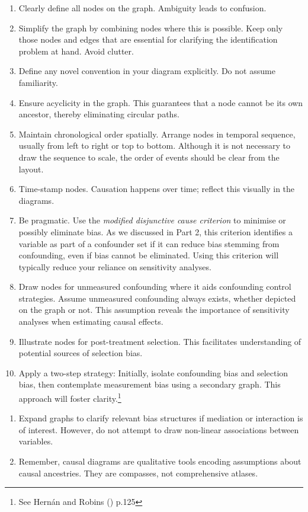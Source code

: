 \documentclass[
  singlecolumn,
  9pt]{article}
\begin{document}
\begin{enumerate}
\def\labelenumi{\arabic{enumi}.}
\item
  Clearly define all nodes on the graph. Ambiguity leads to confusion.
\item
  Simplify the graph by combining nodes where this is possible. Keep
  only those nodes and edges that are essential for clarifying the
  identification problem at hand. Avoid clutter.
\item
  Define any novel convention in your diagram explicitly. Do not assume
  familiarity.
\item
  Ensure acyclicity in the graph. This guarantees that a node cannot be
  its own ancestor, thereby eliminating circular paths.
\item
  Maintain chronological order spatially. Arrange nodes in temporal
  sequence, usually from left to right or top to bottom. Although it is
  not necessary to draw the sequence to scale, the order of events
  should be clear from the layout.
\item
  Time-stamp nodes. Causation happens over time; reflect this visually
  in the diagrams.
\item
  Be pragmatic. Use the \emph{modified disjunctive cause criterion} to
  minimise or possibly eliminate bias. As we discussed in Part 2, this
  criterion identifies a variable as part of a confounder set if it can
  reduce bias stemming from confounding, even if bias cannot be
  eliminated. Using this criterion will typically reduce your reliance
  on sensitivity analyses.
\item
  Draw nodes for unmeasured confounding where it aids confounding
  control strategies. Assume unmeasured confounding always exists,
  whether depicted on the graph or not. This assumption reveals the
  importance of sensitivity analyses when estimating causal effects.
\item
  Illustrate nodes for post-treatment selection. This facilitates
  understanding of potential sources of selection bias.
\item
  Apply a two-step strategy: Initially, isolate confounding bias and
  selection bias, then contemplate measurement bias using a secondary
  graph. This approach will foster clarity.\footnote{See Hernán and
    Robins () p.125}
\end{enumerate}

\begin{enumerate}
\def\labelenumi{\arabic{enumi}.}
\setcounter{enumi}{10}
\item
  Expand graphs to clarify relevant bias structures if mediation or
  interaction is of interest. However, do not attempt to draw non-linear
  associations between variables.
\item
  Remember, causal diagrams are qualitative tools encoding assumptions
  about causal ancestries. They are compasses, not comprehensive
  atlases.
\end{enumerate}
\end{document}
